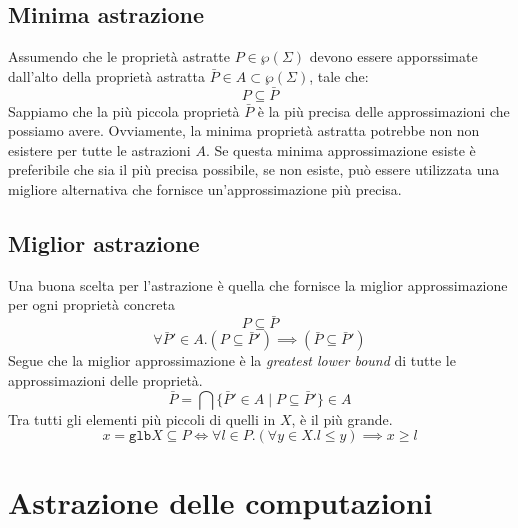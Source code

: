 \subsection{Minima astrazione}
Assumendo che le proprietà astratte $P \in \wp(\Sigma)$ devono essere apporssimate 
dall'alto della proprietà astratta $\bar{P} \in A \subset \wp(\Sigma)$, tale che:
\[
  P \subseteq \bar{P}
\]
Sappiamo che la più piccola proprietà $\bar{P}$ è la più precisa delle approssimazioni che possiamo avere.
Ovviamente, la minima proprietà astratta potrebbe non non esistere per tutte le astrazioni $A$.
Se questa minima approssimazione esiste è preferibile che sia il più precisa possibile, se non esiste,
può essere utilizzata una
migliore alternativa che fornisce un'approssimazione più precisa.
\subsection{Miglior astrazione}
Una buona scelta per l'astrazione è quella che fornisce la
miglior approssimazione per ogni proprietà concreta
\[
  P \subseteq \bar{P}
\]
\[
  \forall \bar{P}' \in A . (P \subseteq \bar{P}') \implies (\bar{P} \subseteq \bar{P}')
\]
Segue che la miglior approssimazione è la \textit{greatest lower bound} di tutte le approssimazioni
delle proprietà.
\[
\bar{P} = \bigcap \{\bar{P}' \in A \mid P \subseteq \bar{P}'\} \in A
\]
Tra tutti gli elementi più piccoli di quelli in $X$, è il più grande.
\[
  x = \texttt{glb}X \subseteq P \iff \forall l \in P . (\forall y \in X. l \leq y) \implies x \geq l
\]
\section{Astrazione delle computazioni}